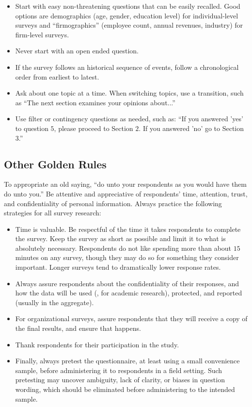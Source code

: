 \begin{itemize}
	\item Start with easy non-threatening questions that can be easily recalled. Good options are	demographics (age, gender, education level) for individual-level surveys and ``firmographics'' (employee count, annual revenues, industry) for firm-level surveys.
	\item Never start with an open ended question.
	\item If the survey follows an historical sequence of events, follow a chronological order from earliest to latest.
	\item Ask about one topic at a time. When switching topics, use a transition, such as ``The next section examines your opinions about...''
	\item Use filter or contingency questions as needed, such as: ``If you answered 'yes' to question $ 5 $, please proceed to Section $ 2 $. If you answered 'no' go to Section $ 3 $.''
\end{itemize}

\subsection{Other Golden Rules}

To appropriate an old saying, ``do unto your respondents as you would have them do unto you.'' Be attentive and appreciative of respondents' time, attention, trust, and confidentiality of personal information. Always practice the following strategies for all survey research:

\begin{itemize}
	\item Time is valuable. Be respectful of the time it takes respondents to complete the survey. Keep the survey as short as possible and limit it to what is absolutely necessary. Respondents do not like spending more than about $ 15 $ minutes on any survey, though they may do so for something they consider important. Longer surveys tend to dramatically lower response rates.
	\item Always assure respondents about the confidentiality of their responses, and how the data will be used (\eg, for academic research), protected, and reported (usually in the aggregate).
	\item For organizational surveys, assure respondents that they will receive a copy of the final results, and ensure that happens.
	\item Thank respondents for their participation in the study.
	\item Finally, always pretest the questionnaire, at least using a small convenience sample, before administering it to respondents in a field setting. Such pretesting may uncover ambiguity, lack of clarity, or biases in question wording, which should be eliminated before administering to the intended sample.
\end{itemize}

